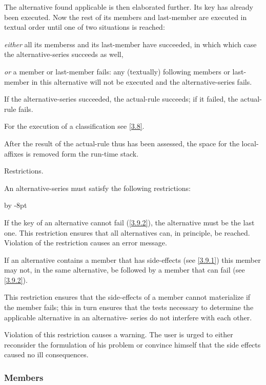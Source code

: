 \documentclass{article}
\newcommand\g[1]{{\sf #1}}
\renewenvironment{itemize}{\begin{list}{}{%
\advance\leftmargin by -8pt%
\setlength\itemsep{0ex plus 0.2ex}%
\setlength\partopsep{3pt}%
\setlength\topsep{2pt plus 2pt}%
\setlength\parsep{0pt plus 2pt}%
}}{\end{list}}
\begin{document}
The \g{alternative} found applicable is then elaborated further. Its key 
has already been executed. Now the rest of its \g{member}s and
\g{last-member} are
executed in textual order until one of two situations is reached:

\emph{either} all its \g{members}s and its \g{last-member} have succeeded, in which which case the
\g{alternative-series} succeeds as well,

\emph{or} a member or \g{last-member} fails: any (textually) following \g{member}s 
or \g{last-member} in this
\g{alternative} will not be executed and the \g{alternative-series} fails.

If the \g{alternative-series} succeeded, the \g{actual-rule} succeeds; if
it failed, the \g{actual-rule} fails.

For the execution of a \g{classification} see \ref{3.8}.

After the result of the \g{actual-rule} thus has been assessed, the
space for the \g{local-affix}es is removed form the run-time stack.

\smallskip\noindent
Restrictions.

An \g{alternative-series} must satisfy the following restrictions:
\begin{itemize}
\item[a.]
If the key of an \g{alternative} cannot fail (\ref{3.9.2}), the
\g{alternative} must be the last one. This restriction ensures that all
\g{alternative}s can, in principle, be reached. Violation of the restriction
causes an error message.
\item[b.]
If an \g{alternative} contains a \g{member} that has side-effects (see
\ref{3.9.1}) this \g{member} may not, in the same \g{alternative}, be followed by
a \g{member} that can fail (see \ref{3.9.2}).

This restriction ensures that the side-effects of a \g{member} cannot
materialize if the \g{member} fails; this in turn ensures that the tests
necessary to determine the applicable \g{alternative} in an \g{alternative-%
series} do not interfere with each other.

Violation of this restriction
causes a warning. The user is urged to either reconsider the formulation of
his problem or convince himself that the side effects caused no ill
consequences.
\end{itemize}

\subsubsection{Members}\label{3.2.3}
\end{document}
